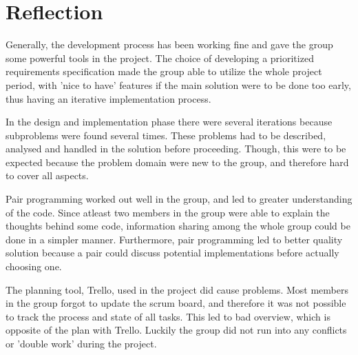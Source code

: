 \section{Reflection}
Generally, the development process has been working fine and gave the group some powerful tools in the project. The choice of developing a prioritized requirements specification made the group able to utilize the whole project period, with 'nice to have' features if the main solution were to be done too early, thus having an iterative implementation process.

In the design and implementation phase there were several iterations because subproblems were found several times. These problems had to be described, analysed and handled in the solution before proceeding. Though, this were to be expected because the problem domain were new to the group, and therefore hard to cover all aspects.

Pair programming worked out well in the group, and led to greater understanding of the code. Since atleast two members in the group were able to explain the thoughts behind some code, information sharing among the whole group could be done in a simpler manner. Furthermore, pair programming led to better quality solution because a pair could discuss potential implementations before actually choosing one.

The planning tool, Trello, used in the project did cause problems. Most members in the group forgot to update the scrum board, and therefore it was not possible to track the process and state of all tasks. This led to bad overview, which is opposite of the plan with Trello. Luckily the group did not run into any conflicts or 'double work' during the project.
